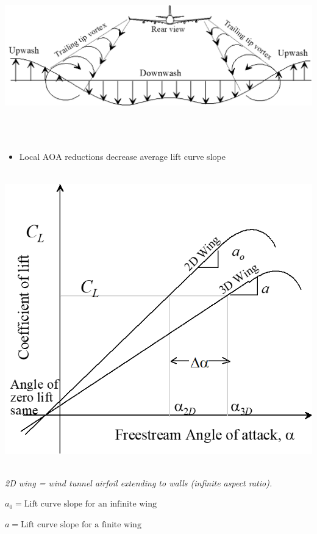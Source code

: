 \documentclass[
]{book}
\providecommand{\tightlist}{%
  \setlength{\itemsep}{0pt}\setlength{\parskip}{0pt}}
\begin{document}
\includegraphics[width=8.8in,height=2.882in]{media/05/image15.png}

\begin{itemize}
\tightlist
\item
  Local \(\mathrm{AOA}\) reductions decrease average lift curve slope
\end{itemize}

\includegraphics[width=5.715in,height=5.024in]{media/05/image16.png}

\emph{2D wing = wind tunnel airfoil extending to walls (infinite aspect ratio).}

\(a_0 = \text{Lift curve slope for an infinite wing}\)

\(a = \text{Lift curve slope for a finite wing}\)
\end{document}
